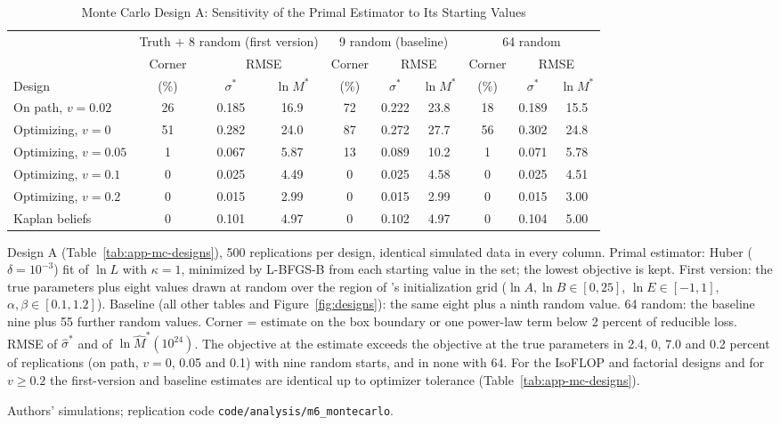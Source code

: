 \begin{table}[tp]
\centering
\caption{Monte Carlo Design A: Sensitivity of the Primal Estimator to Its Starting Values}
\label{tab:app-mc-starts}
\footnotesize
\setlength{\tabcolsep}{3.5pt}
\begin{tabular}{@{}lccccccccc@{}}
\toprule
 & \multicolumn{3}{c}{Truth $+$ 8 random (first version)} & \multicolumn{3}{c}{9 random (baseline)} & \multicolumn{3}{c}{64 random} \\
\cmidrule(lr){2-4}\cmidrule(lr){5-7}\cmidrule(l){8-10}
 & Corner & \multicolumn{2}{c}{RMSE} & Corner & \multicolumn{2}{c}{RMSE} & Corner & \multicolumn{2}{c}{RMSE} \\
\cmidrule(lr){3-4}\cmidrule(lr){6-7}\cmidrule(l){9-10}
Design & (\%) & $\sigma^*$ & $\ln M^*$ & (\%) & $\sigma^*$ & $\ln M^*$ & (\%) & $\sigma^*$ & $\ln M^*$ \\
\midrule
On path, $v=0.02$ & 26 & 0.185 & 16.9 & 72 & 0.222 & 23.8 & 18 & 0.189 & 15.5 \\
Optimizing, $v=0$ & 51 & 0.282 & 24.0 & 87 & 0.272 & 27.7 & 56 & 0.302 & 24.8 \\
Optimizing, $v=0.05$ & 1 & 0.067 & 5.87 & 13 & 0.089 & 10.2 & 1 & 0.071 & 5.78 \\
Optimizing, $v=0.1$ & 0 & 0.025 & 4.49 & 0 & 0.025 & 4.58 & 0 & 0.025 & 4.51 \\
Optimizing, $v=0.2$ & 0 & 0.015 & 2.99 & 0 & 0.015 & 2.99 & 0 & 0.015 & 3.00 \\
Kaplan beliefs & 0 & 0.101 & 4.97 & 0 & 0.102 & 4.97 & 0 & 0.104 & 5.00 \\
\bottomrule
\end{tabular}
\par\smallskip
\begin{tablenotes}Design A (Table~\ref{tab:app-mc-designs}), 500 replications per design, identical simulated data in every column. Primal estimator: Huber ($\delta=10^{-3}$) fit of $\ln L$ with $\kappa=1$, minimized by L-BFGS-B from each starting value in the set; the lowest objective is kept. First version: the true parameters plus eight values drawn at random over the region of \citet{hoffmann2022training}'s initialization grid ($\ln A,\ln B\in[0,25]$, $\ln E\in[-1,1]$, $\alpha,\beta\in[0.1,1.2]$). Baseline (all other tables and Figure~\ref{fig:designs}): the same eight plus a ninth random value. 64 random: the baseline nine plus 55 further random values. Corner = estimate on the box boundary or one power-law term below 2 percent of reducible loss. RMSE of $\hat\sigma^*$ and of $\ln\hat M^*(10^{24})$. The objective at the estimate exceeds the objective at the true parameters in 2.4, 0, 7.0 and 0.2 percent of replications (on path, $v=0$, 0.05 and 0.1) with nine random starts, and in none with 64. For the IsoFLOP and factorial designs and for $v\ge0.2$ the first-version and baseline estimates are identical up to optimizer tolerance (Table~\ref{tab:app-mc-designs}).\end{tablenotes}
\begin{tablenotes}[Source]Authors' simulations; replication code \texttt{code/analysis/m6\_montecarlo}.\end{tablenotes}
\end{table}
